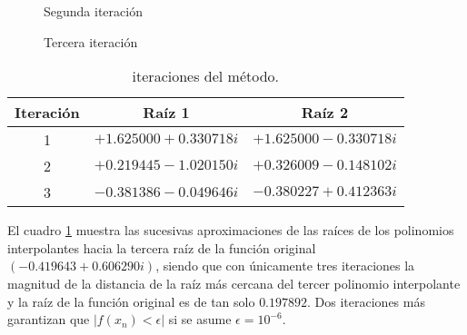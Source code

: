 \begin{figure}
    \centering
    \caption{Segunda iteración}
    \label{second_poly}
\end{figure}
\begin{figure}
    \centering
    \caption{Tercera iteración}
    \label{third_poly}
\end{figure}
\begin{table}[h!]
    \centering
    \caption{iteraciones del método.}
    \label{iterations_table}
    \begin{tabular}{c|c|c}
        \textbf{Iteración} & \textbf{Raíz 1} & \textbf{Raíz 2}\\
        \hline
        1 & $+1.625000+0.330718i$ & $+1.625000-0.330718i$\\
        2 & $+0.219445-1.020150i$ & $+0.326009-0.148102i$\\
        3 & $-0.381386-0.049646i$ & $-0.380227+0.412363i$\\
    \end{tabular}
\end{table}
El cuadro \ref{iterations_table} muestra las sucesivas aproximaciones de las raíces de los polinomios interpolantes
hacia la tercera raíz de la función original $(-0.419643+0.606290i)$, siendo que con únicamente tres iteraciones la
magnitud de la distancia de la raíz más cercana del tercer polinomio interpolante y la raíz de la función original es
de tan solo $0.197892$. Dos iteraciones más garantizan que $|f(x_n)<\epsilon|$ si se asume $\epsilon=10^{-6}$.
